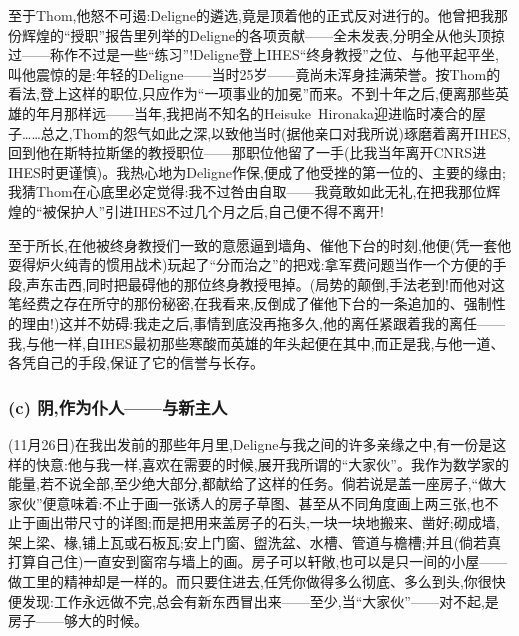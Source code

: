 至于Thom,他怒不可遏:Deligne的遴选,竟是顶着他的正式反对进行的。他曾把我那份辉煌的“授职”报告里列举的Deligne的各项贡献——全未发表,分明全从他头顶掠过——称作不过是一些“练习”!Deligne登上IHES“终身教授”之位、与他平起平坐,叫他震惊的是:年轻的Deligne——当时25岁——竟尚未浑身挂满荣誉。按Thom的看法,登上这样的职位,只应作为“一项事业的加冕”而来。不到十年之后,便离那些英雄的年月那样远——当年,我把尚不知名的Heisuke~Hironaka迎进临时凑合的屋子……总之,Thom的怨气如此之深,以致他当时(据他亲口对我所说)琢磨着离开IHES,回到他在斯特拉斯堡的教授职位——那职位他留了一手(比我当年离开CNRS进IHES时更谨慎)。我热心地为Deligne作保,便成了他受挫的第一位的、主要的缘由;我猜Thom在心底里必定觉得:我不过咎由自取——我竟敢如此无礼,在把我那位辉煌的“被保护人”引进IHES不过几个月之后,自己便不得不离开!

至于所长,在他被终身教授们一致的意愿逼到墙角、催他下台的时刻,他便(凭一套他耍得炉火纯青的惯用战术)玩起了“分而治之”的把戏:拿军费问题当作一个方便的手段,声东击西,同时把最碍他的那位终身教授甩掉。(局势的颠倒,手法老到!而他对这笔经费之存在所守的那份秘密,在我看来,反倒成了催他下台的一条追加的、强制性的理由!)这并不妨碍:我走之后,事情到底没再拖多久,他的离任紧跟着我的离任——我,与他一样,自IHES最初那些寒酸而英雄的年头起便在其中,而正是我,与他一道、各凭自己的手段,保证了它的信誉与长存\dmark{}。

\subsubsection*{(c) 阴,作为仆人——与新主人}
\label{ch18:local:h46}

\label{ch18:local:n42}

(11月26日)在我出发前的那些年月里,Deligne与我之间的许多亲缘之中,有一份是这样的快意:他与我一样,喜欢在需要的时候,展开我所谓的“大家伙”。我作为数学家的能量,若不说全部,至少绝大部分,都献给了这样的任务。倘若说是盖一座房子,“做大家伙”便意味着:不止于画一张诱人的房子草图、甚至从不同角度画上两三张,也不止于画出带尺寸的详图;而是把用来盖房子的石头,一块一块地搬来、凿好;砌成墙,架上梁、椽,铺上瓦或石板瓦;安上门窗、盥洗盆、水槽、管道与檐槽;并且(倘若真打算自己住)一直安到窗帘与墙上的画。房子可以轩敞,也可以是只一间的小屋——做工里的精神却是一样的。而只要住进去,任凭你做得多么彻底、多么到头,你很快便发现:工作永远做不完,总会有新东西冒出来——至少,当“大家伙”——对不起,是房子——够大的时候。

